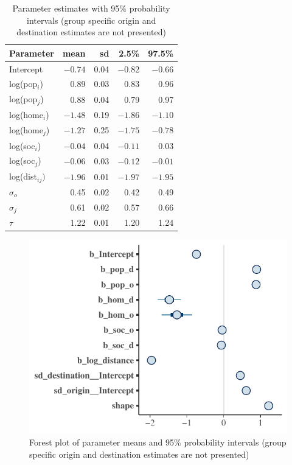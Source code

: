 \documentclass[fleqn,10pt]{SelfArx} %
\begin{document}
{{%
\begin{table}[ht]
  \centering
  \caption{Parameter estimates with 95\% probability intervals (group specific origin and destination estimates are not presented)}
  \label{tab:coef}
  \begin{tabular}{lrrrr}
    \toprule
    Parameter & mean & sd & 2.5\% & 97.5\% \\ 
    \midrule
    Intercept      & $-0.74$ & 0.04 & $-0.82$ & $-0.66$ \\ 
    log(pop$_i$)   & 0.89 & 0.03 & 0.83 & 0.96 \\ 
    log(pop$_j$)   & 0.88 & 0.04 & 0.79 & 0.97 \\ 
    log(home$_i$)  & $-1.48$ & 0.19 & $-1.86$ & $-1.10$ \\ 
    log(home$_j$)  & $-1.27$ & 0.25 & $-1.75$ & $-0.78$ \\ 
    log(soc$_i$)   & $-0.04$ & 0.04 & $-0.11$ & 0.03 \\
    log(soc$_j$)   & $-0.06$ & 0.03 & $-0.12$ & $-0.01$ \\ 
    log(dist$_{ij})$ & $-1.96$ & 0.01 & $-1.97$ & $-1.95$ \\ 
    $\sigma_o$    & 0.45 & 0.02 & 0.42 & 0.49 \\ 
    $\sigma_j$    & 0.61 & 0.02 & 0.57 & 0.66 \\ 
    $\tau$        & 1.22 & 0.01 & 1.20 & 1.24 \\ 
    \bottomrule
  \end{tabular}
\end{table}

\begin{figure}
  \includegraphics[width = \columnwidth]{../fig/forestplot.pdf}
  \caption{Forest plot of parameter means and 95\% probability
    intervals (group specific origin and destination estimates are not
    presented)}
  \label{fig:forestplot}
\end{figure}

}}
\end{document}
